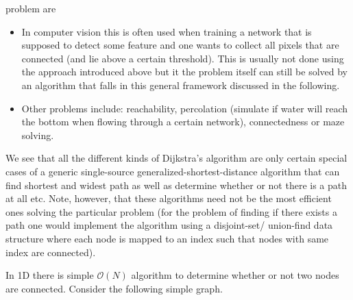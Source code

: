 problem are
\begin{itemize}
\item In computer vision this is often used when training a network
  that is supposed to detect some feature and one wants to collect all
  pixels that are connected (and lie above a certain threshold). This
  is usually not done using the approach introduced above but it the
  problem itself can still be solved by an algorithm that falls in
  this general framework discussed in the following.
\item Other problems include: reachability, percolation (simulate if
  water will reach the bottom when flowing through a certain network),
  connectedness or maze solving.
\end{itemize}
We see that all the different kinds of Dijkstra's algorithm are only
certain special cases of a generic single-source
generalized-shortest-distance algorithm that can find shortest and
widest path as well as determine whether or not there is a path at all
etc. Note, however, that these algorithms need not be the most
efficient ones solving the particular problem (\eg for the problem of
finding if there exists a path one would implement the algorithm using
a disjoint-set/ union-find data structure where each node is mapped to
an index such that nodes with same index are connected).

In 1D there is simple $\mathcal{O}(N)$ algorithm to determine whether
or not two nodes are connected. Consider the following simple graph.
\vspace*{2em}
\begin{figure}[h!]
  \centering
\end{figure}

